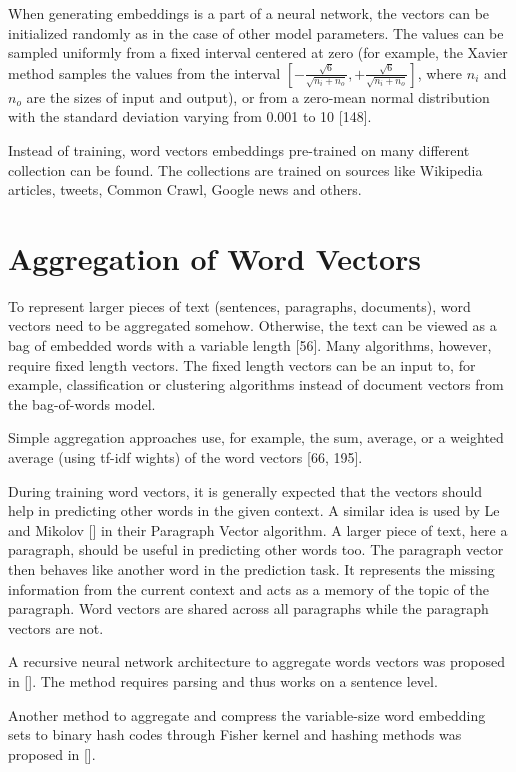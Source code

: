 When generating embeddings is a part of a neural network, the vectors can be initialized randomly as in the case of other model parameters. The values can be sampled uniformly from a fixed interval centered at zero (for example, the Xavier method samples the values from the interval $\left[-\frac{\sqrt{6}}{\sqrt{n_{i}+n_{o}}},+\frac{\sqrt{6}}{\sqrt{n_{i}+n_{o}}}\right]$, where $n_{i}$ and $n_{o}$ are the sizes of input and output), or from a zero-mean normal distribution with the standard deviation varying from 0.001 to 10 [148].

Instead of training, word vectors embeddings pre-trained on many different collection can be found. The collections are trained on sources like Wikipedia articles, tweets, Common Crawl, Google news and others.

\section{Aggregation of Word Vectors}
To represent larger pieces of text (sentences, paragraphs, documents), word vectors need to be aggregated somehow. Otherwise, the text can be viewed as a bag of embedded words with a variable length [56]. Many algorithms, however, require fixed length vectors. The fixed length vectors can be an input to, for example, classification or clustering algorithms instead of document vectors from the bag-of-words model.

Simple aggregation approaches use, for example, the sum, average, or a weighted average (using tf-idf wights) of the word vectors [66, 195].

During training word vectors, it is generally expected that the vectors should help in predicting other words in the given context. A similar idea is used by Le and Mikolov [\cite{ref162}] in their Paragraph Vector algorithm. A larger piece of text, here a paragraph, should be useful in predicting other words too. The paragraph vector then behaves like another word in the prediction task. It represents the missing information from the current context and acts as a memory of the topic of the paragraph. Word vectors are shared across all paragraphs while the paragraph vectors are not.

A recursive neural network architecture to aggregate words vectors was proposed in [\cite{ref253}]. The method requires parsing and thus works on a sentence level.

Another method to aggregate and compress the variable-size word embedding sets to binary hash codes through Fisher kernel and hashing methods was proposed in [\cite{ref290}].

